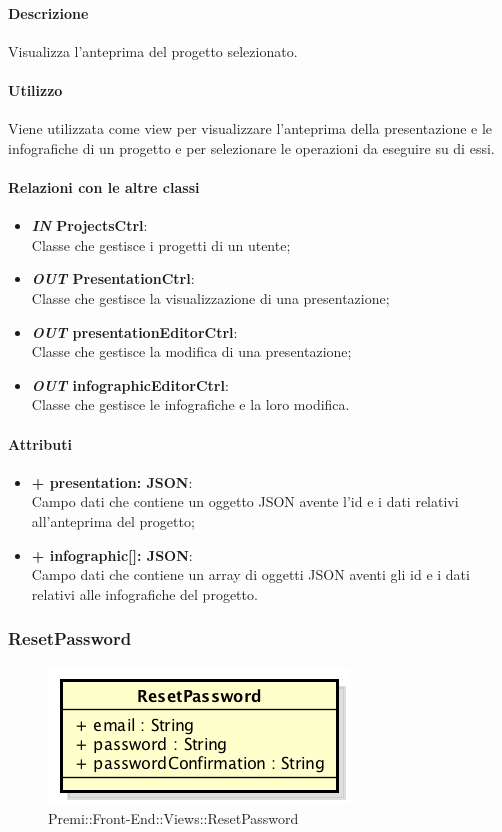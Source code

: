 	\paragraph{Descrizione}
	Visualizza l'anteprima del progetto selezionato.
	
	\paragraph{Utilizzo}
	Viene utilizzata come view per visualizzare l'anteprima della presentazione e le infografiche di un progetto e per selezionare le operazioni da eseguire su di essi.
	
	\paragraph{Relazioni con le altre classi}
	\begin{itemize}
		\item \textbf{\textit{IN} ProjectsCtrl}:\\
			Classe che gestisce i progetti di un utente;
		\item \textbf{\textit{OUT} PresentationCtrl}:\\
			Classe che gestisce la visualizzazione di una presentazione;
		\item \textbf{\textit{OUT} presentationEditorCtrl}:\\
			Classe che gestisce la modifica di una presentazione;
		\item \textbf{\textit{OUT} infographicEditorCtrl}:\\
			Classe che gestisce le infografiche e la loro modifica.
	\end{itemize}
	
	\paragraph{Attributi}
	\begin{itemize}
		\item \textbf{+ presentation: JSON}:\\
			Campo dati che contiene un oggetto JSON avente l'id e i dati relativi all'anteprima del progetto;
		\item \textbf{+ infographic[]: JSON}:\\
			Campo dati che contiene un array di oggetti JSON aventi gli id e i dati relativi alle infografiche del progetto.
	\end{itemize}
\newpage
	
	
\subsubsection{ResetPassword}
	\begin{figure}[h]
		\centering
		\includegraphics[width=0.3\linewidth]{img/premi_front_end_views_resetpassword}
		\caption[Premi::Front-End::Views::ResetPassword]{Premi::Front-End::Views::ResetPassword}
	\end{figure}
	
